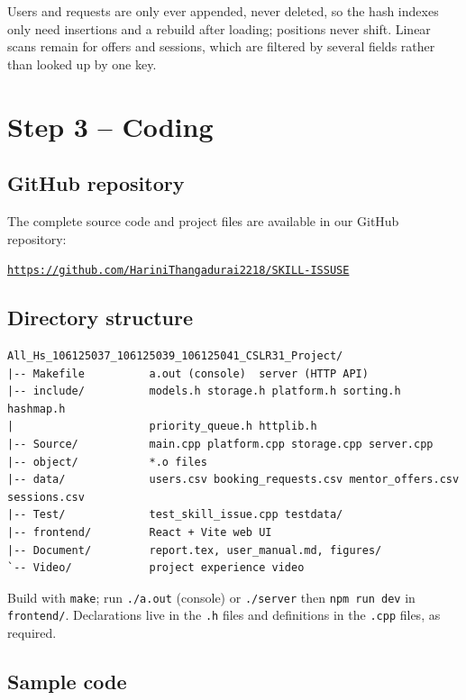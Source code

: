 \documentclass[11pt,a4paper]{article}
\begin{document}
Users and requests are only ever appended, never deleted, so the hash indexes only need insertions and a rebuild after loading; positions never shift. Linear scans remain for offers and sessions, which are filtered by several fields rather than looked up by one key.

\section{Step 3 -- Coding}

\subsection{GitHub repository}

The complete source code and project files are available in our GitHub repository:

\begin{center}
\href{https://github.com/HariniThangadurai2218/SKILL-ISSUSE}{\texttt{https://github.com/HariniThangadurai2218/SKILL-ISSUSE}}
\end{center}

\subsection{Directory structure}

\begin{lstlisting}[language={},numbers=none]
All_Hs_106125037_106125039_106125041_CSLR31_Project/
|-- Makefile          a.out (console)  server (HTTP API)
|-- include/          models.h storage.h platform.h sorting.h hashmap.h
|                     priority_queue.h httplib.h
|-- Source/           main.cpp platform.cpp storage.cpp server.cpp
|-- object/           *.o files
|-- data/             users.csv booking_requests.csv mentor_offers.csv sessions.csv
|-- Test/             test_skill_issue.cpp testdata/
|-- frontend/         React + Vite web UI
|-- Document/         report.tex, user_manual.md, figures/
`-- Video/            project experience video
\end{lstlisting}

Build with \texttt{make}; run \texttt{./a.out} (console) or \texttt{./server} then \texttt{npm run dev} in \texttt{frontend/}. Declarations live in the \texttt{.h} files and definitions in the \texttt{.cpp} files, as required.

\subsection{Sample code}
\end{document}
